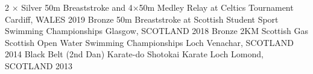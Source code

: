 

\begin{cvhonors}
  \cvhonor
    {2 × Silver} %
    {50m Breaststroke and 4×50m Medley Relay at Celtics Tournament} %
    {Cardiff, WALES} %
    {2019} %
  \cvhonor
    {Bronze} %
    {50m Breaststroke at Scottish Student Sport Swimming Championships} %
    {Glasgow, SCOTLAND} %
    {2018} %
  \cvhonor
    {Bronze} %
    {2KM Scottish Gas Scottish Open Water Swimming Championships} %
    {Loch Venachar, SCOTLAND} %
    {2014} %
  \cvhonor
    {Black Belt (2nd Dan)} %
    {Karate-do Shotokai Karate} %
    {Loch Lomond, SCOTLAND} %
    {2013} %
\end{cvhonors}
